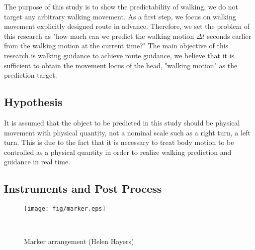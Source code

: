 \documentclass{sigchi}
\begin{document}
The purpose of this study is to show the predictability of walking, we do not target any arbitrary walking movement. As a first step, we focus on walking movement explicitly designed route in advance. Therefore, we set the problem of this research as "how much can we predict the walking motion $\Delta t$ seconds earlier from the walking motion at the current time?" The main objective of this research is walking guidance to achieve route guidance, we believe that it is sufficient to obtain the movement locus of the head, "walking motion" as the prediction target.

\subsection{Hypothesis} %
It is assumed that the object to be predicted in this study should be physical movement with physical quantity, not a nominal scale such as a right turn, a left turn. This is due to the fact that it is necessary to treat body motion to be controlled as a physical quantity in order to realize walking prediction and guidance in real time. 

\subsection{Instruments and Post Process} %

\begin{figure}
\centering
  \texttt{[image: fig/marker.eps]}
  \caption{Marker arrangement (Helen Hayers)}~ \label{fig:marker}
\end{figure}

\end{document}
